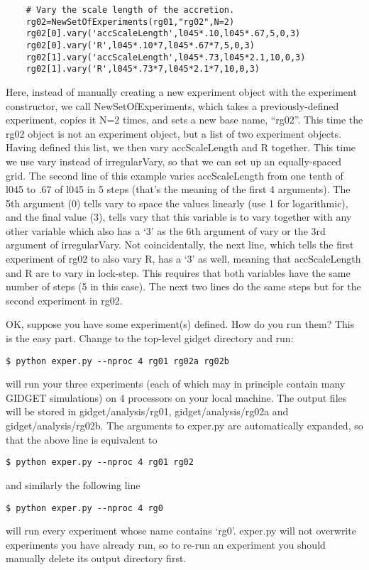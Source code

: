 \documentclass[11pt]{amsart}
\begin{document}
\begin{lstlisting}
    # Vary the scale length of the accretion.
    rg02=NewSetOfExperiments(rg01,"rg02",N=2)
    rg02[0].vary('accScaleLength',l045*.10,l045*.67,5,0,3)
    rg02[0].vary('R',l045*.10*7,l045*.67*7,5,0,3)
    rg02[1].vary('accScaleLength',l045*.73,l045*2.1,10,0,3)
    rg02[1].vary('R',l045*.73*7,l045*2.1*7,10,0,3)
\end{lstlisting}
Here, instead of manually creating a new experiment object with the experiment constructor, we call NewSetOfExperiments, which takes a previously-defined experiment, copies it N=2 times, and sets a new base name, ``rg02''. This time the rg02 object is not an experiment object, but a list of two experiment objects. Having defined this list, we then vary accScaleLength and R together. This time we use vary instead of irregularVary, so that we can set up an equally-spaced grid. The second line of this example varies accScaleLength from one tenth of l045 to .67 of l045 in 5 steps (that's the meaning of the first 4 arguments). The 5th argument (0) tells vary to space the values linearly (use 1 for logarithmic), and the final value (3), tells vary that this variable is to vary together with any other variable which also has a `3' as the 6th argument of vary or the 3rd argument of irregularVary. Not coincidentally, the next line, which tells the first experiment of rg02 to also vary R, has a `3' as well, meaning that accScaleLength and R are to vary in lock-step. This requires that both variables have the same number of steps (5 in this case). The next two lines do the same steps but for the second experiment in rg02. 

OK, suppose you have some experiment(s) defined. How do you run them? This is the easy part. Change to the top-level gidget directory and run:
\begin{verbatim}
$ python exper.py --nproc 4 rg01 rg02a rg02b
\end{verbatim}
will run your three experiments (each of which may in principle contain many GIDGET simulations) on 4 processors on your local machine. The output files will be stored in gidget/analysis/rg01, gidget/analysis/rg02a and gidget/analysis/rg02b. The arguments to exper.py are automatically expanded, so that the above line is equivalent to
\begin{verbatim}
$ python exper.py --nproc 4 rg01 rg02
\end{verbatim}
and similarly the following line
\begin{verbatim}
$ python exper.py --nproc 4 rg0
\end{verbatim}
will run every experiment whose name contains `rg0'. exper.py will not overwrite experiments you have already run, so to re-run an experiment you should manually delete its output directory first.
\end{document}
